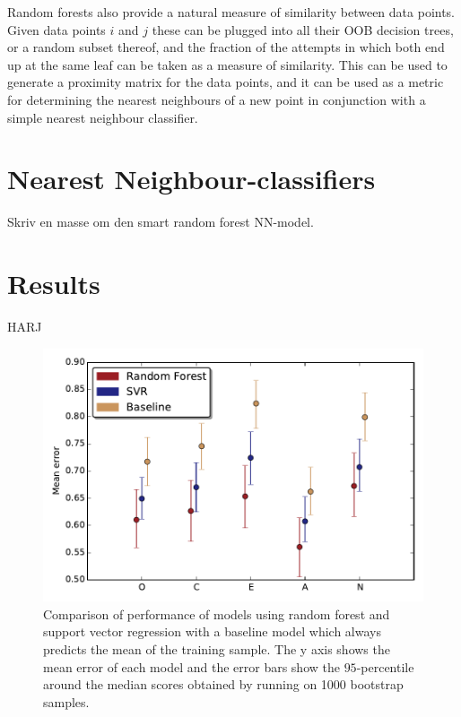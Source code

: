 Random forests also provide a natural measure of similarity between data points. Given data points $i$ and $j$ these can be plugged into all their OOB decision trees, or a random subset thereof, and the fraction of the attempts in which both end up at the same leaf can be taken as a measure of similarity. This can be used to generate a proximity matrix for the data points, and it can be used as a metric for determining the nearest neighbours of a new point in conjunction with a simple nearest neighbour classifier.

\section{Nearest Neighbour-classifiers}
Skriv en masse om den smart random forest NN-model. 


\section{Results}
\FloatBarrier
HARJ
\begin{figure}
	\includegraphics[width=\figwidth]{pics/ml/bootstrap_results_rf_svr_twosigma.pdf}
	\caption{Comparison of performance of models using {\color{moerkeroed}random forest} and {\color{oldhat}support vector regression} with a {\color{nude} baseline model} which always predicts the mean of the training sample. The y axis shows the mean error of each model and the error bars show the $95$-percentile around the median scores obtained by running on 1000 bootstrap samples.}
	\label{fig:bootstrap_results_rf}
\end{figure}